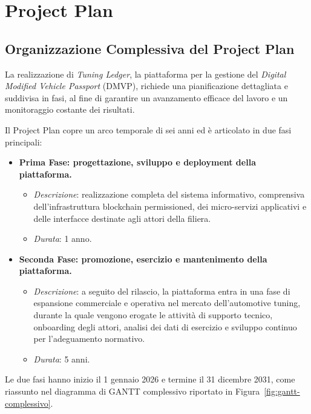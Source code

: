 \chapter{Project Plan}

\section{Organizzazione Complessiva del Project Plan}

La realizzazione di \textit{Tuning Ledger}, la piattaforma per la gestione del \textit{Digital Modified Vehicle Passport} (DMVP), richiede una pianificazione dettagliata e suddivisa in fasi, al fine di garantire un avanzamento efficace del lavoro e un monitoraggio costante dei risultati.

Il Project Plan copre un arco temporale di sei anni ed è articolato in due fasi principali:

\begin{itemize}
    \item \textbf{Prima Fase: progettazione, sviluppo e deployment della piattaforma.}
    \begin{itemize}
        \item \textit{Descrizione}: realizzazione completa del sistema informativo, comprensiva dell'infrastruttura blockchain permissioned, dei micro-servizi applicativi e delle interfacce destinate agli attori della filiera.
        \item \textit{Durata}: 1 anno.
    \end{itemize}
    \item \textbf{Seconda Fase: promozione, esercizio e mantenimento della piattaforma.}
    \begin{itemize}
        \item \textit{Descrizione}: a seguito del rilascio, la piattaforma entra in una fase di espansione commerciale e operativa nel mercato dell'automotive tuning, durante la quale vengono erogate le attività di supporto tecnico, onboarding degli attori, analisi dei dati di esercizio e sviluppo continuo per l'adeguamento normativo.
        \item \textit{Durata}: 5 anni.
    \end{itemize}
\end{itemize}

Le due fasi hanno inizio il 1\textdegree{} gennaio 2026 e termine il 31 dicembre 2031, come riassunto nel diagramma di GANTT complessivo riportato in Figura~\ref{fig:gantt-complessivo}.

